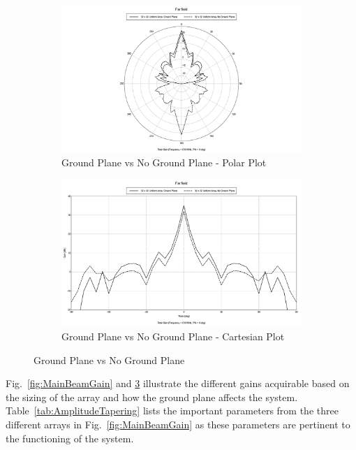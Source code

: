 \documentclass[11pt]{witseiepaper}
\begin{document}
\begin{figure}[htb]
    \centering
    \begin{subfigure}{.5\textwidth}
        \centering
            \includegraphics[width=0.9\linewidth]{GroundPlane-Polar.pdf}
            \caption{Ground Plane vs No Ground Plane - Polar Plot}
            \label{fig:GroundPlane-Polar}
        \end{subfigure}%
        \begin{subfigure}{.5\textwidth}
            \centering
            \includegraphics[width=0.9\linewidth]{GroundPlane-Cartesian.pdf}
            \caption{Ground Plane vs No Ground Plane - Cartesian Plot}
                \label{fig:GroundPlane-Cartesian}
            \end{subfigure}
\caption{Ground Plane vs No Ground Plane}
\label{fig:GroundPlane}
\end{figure}

Fig.~\ref{fig:MainBeamGain} and \ref{fig:GroundPlane} illustrate the different gains acquirable based on the sizing of the array and how the ground plane affects the system.
Table~\ref{tab:AmplitudeTapering} lists the important parameters from the three different arrays in Fig.~\ref{fig:MainBeamGain} as these parameters are pertinent to the functioning of the system.
\end{document}
